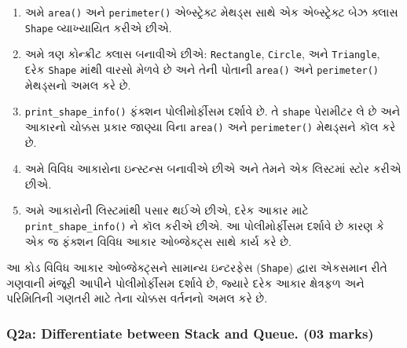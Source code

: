 \begin{enumerate}
\def\labelenumi{\arabic{enumi}.}
\item
  અમે \texttt{area()} અને \texttt{perimeter()} એબ્સ્ટ્રેક્ટ મેથડ્સ સાથે એક એબ્સ્ટ્રેક્ટ
  બેઝ ક્લાસ \texttt{Shape} વ્યાખ્યાયિત કરીએ છીએ.
\item
  અમે ત્રણ કોન્ક્રીટ ક્લાસ બનાવીએ છીએ: \texttt{Rectangle}, \texttt{Circle},
  અને \texttt{Triangle}, દરેક \texttt{Shape} માંથી વારસો મેળવે છે અને તેની
  પોતાની \texttt{area()} અને \texttt{perimeter()} મેથડ્સનો અમલ કરે છે.
\item
  \texttt{print\_shape\_info()} ફંક્શન પોલીમોર્ફીસમ દર્શાવે છે. તે
  \texttt{shape} પેરામીટર લે છે અને આકારનો ચોક્કસ પ્રકાર જાણ્યા વિના
  \texttt{area()} અને \texttt{perimeter()} મેથડ્સને કૉલ કરે છે.
\item
  અમે વિવિધ આકારોના ઇન્સ્ટન્સ બનાવીએ છીએ અને તેમને એક લિસ્ટમાં સ્ટોર કરીએ છીએ.
\item
  અમે આકારોની લિસ્ટમાંથી પસાર થઈએ છીએ, દરેક આકાર માટે
  \texttt{print\_shape\_info()} ને કૉલ કરીએ છીએ. આ પોલીમોર્ફીસમ દર્શાવે છે
  કારણ કે એક જ ફંક્શન વિવિધ આકાર ઓબ્જેક્ટ્સ સાથે કાર્ય કરે છે.
\end{enumerate}

આ કોડ વિવિધ આકાર ઓબ્જેક્ટ્સને સામાન્ય ઇન્ટરફેસ (\texttt{Shape}) દ્વારા એકસમાન રીતે
ગણવાની મંજૂરી આપીને પોલીમોર્ફીસમ દર્શાવે છે, જ્યારે દરેક આકાર ક્ષેત્રફળ અને પરિમિતિની
ગણતરી માટે તેના ચોક્કસ વર્તનનો અમલ કરે છે.

\begin{Shaded}
\begin{Highlighting}[]
\end{Highlighting}
\end{Shaded}

\hypertarget{q2a-differentiate-between-stack-and-queue.-03-marks}{%
\subsubsection{Q2a: Differentiate between Stack and Queue. (03
marks)}\label{q2a-differentiate-between-stack-and-queue.-03-marks}}

